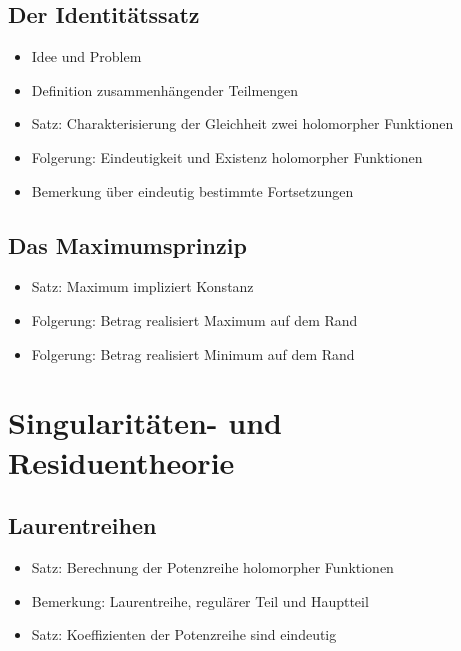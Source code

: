\documentclass[8pt,a4paper,fleqn]{article}
\begin{document}
\begin{multicols}{2}
  \subsection{Der Identitätssatz} %
  \label{sub:der_identitätssatz}
  \begin{itemize}
    \item Idee und Problem
    \item Definition zusammenhängender Teilmengen
    \item Satz: Charakterisierung der Gleichheit zwei holomorpher Funktionen
    \item Folgerung: Eindeutigkeit und Existenz holomorpher Funktionen
    \item Bemerkung über eindeutig bestimmte Fortsetzungen
  \end{itemize}

  \subsection{Das Maximumsprinzip} %
  \label{sub:das_maximumsprinzip}
  \begin{itemize}
    \item Satz: Maximum impliziert Konstanz
    \item Folgerung: Betrag realisiert Maximum auf dem Rand
    \item Folgerung: Betrag realisiert Minimum auf dem Rand
  \end{itemize}

  \section{Singularitäten- und Residuentheorie} %
  \label{sec:singularitäten_und_residuentheorie}
  \subsection{Laurentreihen} %
  \label{sub:laurentreihen}
  \begin{itemize}
    \item Satz: Berechnung der Potenzreihe holomorpher Funktionen
    \item Bemerkung: Laurentreihe, regulärer Teil und Hauptteil
    \item Satz: Koeffizienten der Potenzreihe sind eindeutig
  \end{itemize}


\end{multicols}
\end{document}
